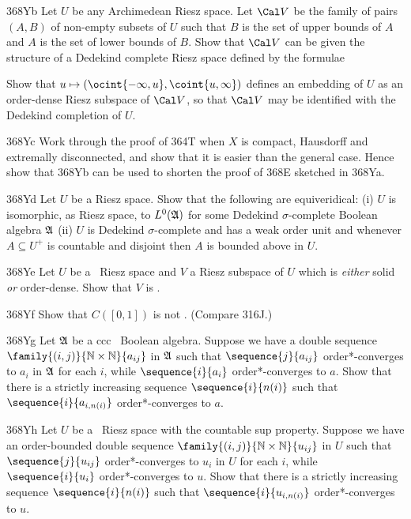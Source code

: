{\spheader 368Yb Let $U$ be any Archimedean Riesz space.   Let $\Cal V$
be the family of pairs $(A,B)$ of non-empty subsets of $U$ such that $B$
is the set of upper bounds of $A$ and $A$ is the set of lower bounds of
$B$.
Show that $\Cal V$ can be given the structure of a Dedekind complete
Riesz
space defined by the formulae




\noindent Show that $u\mapsto(\ocint{-\infty,u},\coint{u,\infty})$
defines
an embedding of $U$ as an order-dense Riesz subspace of $\Cal V$, so
that
$\Cal V$ may be identified with the Dedekind completion of $U$.

\spheader 368Yc Work through the proof of 364T when $X$ is compact,
Hausdorff and extremally disconnected, and show that it is easier than
the general case.   Hence show that 368Yb can be used to shorten the
proof of 368E sketched in 368Ya.

\spheader 368Yd Let $U$ be a Riesz space.   Show that the following are
equiveridical:  (i) $U$ is isomorphic, as Riesz space, to $L^0(\frak A)$
for some Dedekind $\sigma$-complete Boolean algebra $\frak A$ (ii) $U$
is Dedekind $\sigma$-complete and has a weak order unit and whenever
$A\subseteq U^+$ is countable and disjoint then $A$ is
bounded above in $U$.

\spheader 368Ye Let $U$ be a \wsid\ Riesz space and $V$ a Riesz subspace
of $U$ which is {\it either} solid {\it or} order-dense.   Show that $V$
is \wsid.

\spheader 368Yf Show that $C([0,1])$ is not \wsid.   (Compare 316J.)

\spheader 368Yg Let $\frak A$ be a ccc \wsid\ Boolean algebra.
Suppose we have a double sequence
$\family{(i,j)}{\Bbb N\times\Bbb N}{a_{ij}}$ in
$\frak A$ such that $\sequence{j}{a_{ij}}$ order*-converges to $a_i$
in $\frak A$
for each $i$, while $\sequence{i}{a_i}$ order*-converges to $a$.
Show that there
is a strictly increasing sequence $\sequence{i}{n(i)}$ such that
$\sequence{i}{a_{i,n(i)}}$ order*-converges to $a$.

\spheader 368Yh Let $U$ be a \wsid\ Riesz space with the countable sup
property.   Suppose we have an order-bounded double sequence
$\family{(i,j)}{\Bbb N\times\Bbb N}{u_{ij}}$ in
$U$ such that $\sequence{j}{u_{ij}}$ order*-converges to $u_i$ in $U$
for each $i$, while $\sequence{i}{u_i}$ order*-converges to $u$.
Show that there
is a strictly increasing sequence $\sequence{i}{n(i)}$ such that
$\sequence{i}{u_{i,n(i)}}$ order*-converges to $u$.

}
